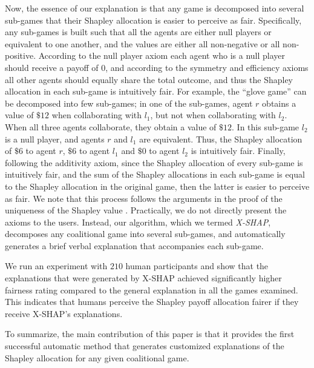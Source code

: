 \documentclass[letterpaper]{article}
\begin{document}
Now, the essence of our explanation is that any game is decomposed into several sub-games that their Shapley allocation is easier to perceive as fair. Specifically, any sub-games is built such that all the agents are either null players or equivalent to one another, and the values are either all non-negative or all non-positive.
According to the null player axiom each agent who is a null player should receive a payoff of $0$, and according to the symmetry and efficiency axioms all other agents should equally share the total outcome, and thus the Shapley allocation in each sub-game is intuitively fair.
For example, the ``glove game'' can be decomposed into few sub-games; in one of the sub-games, agent $r$ obtains a value of $\$12$ when collaborating with $l_1$, but not when collaborating with $l_2$. When all three agents collaborate, they obtain a value of $\$12$. In this sub-game $l_2$ is a null player, and agents $r$ and $l_1$ are equivalent. Thus, the Shapley allocation of $\$6$ to agent $r$, $\$6$ to agent $l_1$ and $\$0$ to agent $l_2$ is intuitively fair. Finally, following the additivity axiom, since the Shapley allocation of every sub-game is intuitively fair, and the sum of the Shapley allocations in each sub-game is equal to the Shapley allocation in the original game, then the latter is easier to perceive as fair. We note that this process follows the arguments in the proof of the uniqueness of the Shapley value \cite{shapley1953value}.
Practically, we do not directly present the axioms to the users. Instead, our algorithm, which we termed \textit{X-SHAP}, decomposes any coalitional game into several sub-games, and automatically generates a brief verbal explanation that accompanies each sub-game.


We run an experiment with $210$ human participants and show that %
the explanations that were generated by X-SHAP achieved significantly higher fairness rating compared to the general explanation in all the games examined. This indicates that humans perceive the Shapley payoff allocation fairer if they receive X-SHAP's explanations.

To summarize, the main contribution of this paper is that it provides the first successful automatic method that generates customized explanations of the Shapley allocation for any given coalitional game.
\end{document}
